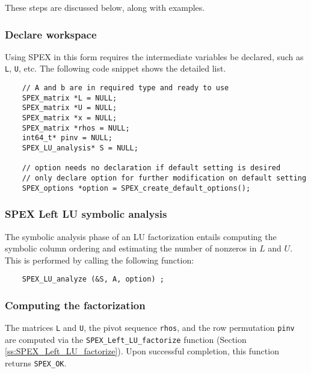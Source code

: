 \documentclass[12pt]{report}
\theoremstyle{definition}
\begin{document}
\noindent These steps are discussed below, along with examples.

\subsubsection{Declare workspace}

Using SPEX in this form requires the intermediate variables be declared, such as \verb|L|, \verb|U|, etc. The following code snippet shows the detailed list.

{\small
\begin{verbatim}
    // A and b are in required type and ready to use
    SPEX_matrix *L = NULL;
    SPEX_matrix *U = NULL;
    SPEX_matrix *x = NULL;
    SPEX_matrix *rhos = NULL;
    int64_t* pinv = NULL;
    SPEX_LU_analysis* S = NULL;

    // option needs no declaration if default setting is desired
    // only declare option for further modification on default setting
    SPEX_options *option = SPEX_create_default_options();
     \end{verbatim} }

\subsubsection{SPEX Left LU symbolic analysis}

The symbolic analysis phase of an LU factorization entails computing the symbolic column ordering and estimating the number of nonzeros in $L$ and $U$. This is performed by calling the following function:

{\small
    \begin{verbatim}
    SPEX_LU_analyze (&S, A, option) ; \end{verbatim} }


\subsubsection{Computing the factorization}

The matrices \verb|L| and \verb|U|, the pivot sequence \verb|rhos|, and the row
permutation \verb|pinv| are computed via the \verb|SPEX_Left_LU_factorize| function
(Section \ref{ss:SPEX_Left_LU_factorize}).  Upon successful completion, this
function returns \verb|SPEX_OK|.
\end{document}
